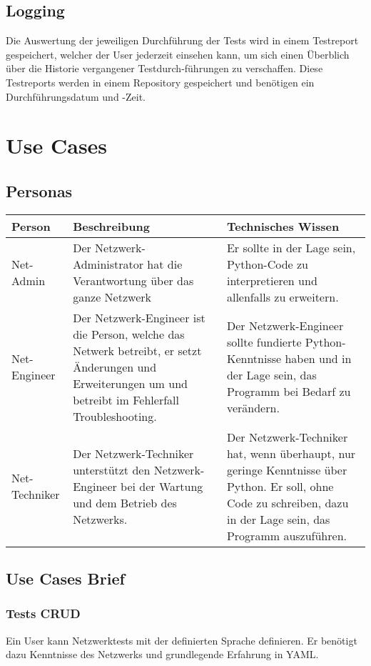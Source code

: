 \documentclass[
	ngerman,
	toc=listof, %
	toc=bibliography, %
	footnotes=multiple, %
	parskip=half, %
	numbers=noendperiod %
]{scrartcl}
\begin{document}
	\subsection{Logging}
		Die Auswertung der jeweiligen Durchführung der Tests wird in einem Testreport gespeichert, welcher der User jederzeit einsehen kann, 
		um sich einen Überblich über die Historie vergangener Testdurch-führungen zu verschaffen. 
		Diese Testreports werden in einem Repository gespeichert und benötigen ein Durchführungsdatum und -Zeit.








\section{Use Cases}
	\subsection{Personas}
		\begin{tabularx}{\textwidth}{lXX}
			\toprule
			Person & Beschreibung & Technisches Wissen \\
			\midrule
			Net-Admin & Der Netzwerk-Administrator hat die Verantwortung über das ganze Netzwerk & Er sollte in der Lage sein, Python-Code zu interpretieren und allenfalls zu erweitern.\\
			\midrule
			Net-Engineer & Der Netzwerk-Engineer ist die Person, welche das Netwerk betreibt, er setzt Änderungen und Erweiterungen um und betreibt im Fehlerfall Troubleshooting. & Der Netzwerk-Engineer sollte fundierte Python-Kenntnisse haben und in der Lage sein, das Programm bei Bedarf zu verändern. \\
			\midrule
			Net-Techniker & Der Netzwerk-Techniker unterstützt den Netzwerk-Engineer bei der Wartung und dem Betrieb des Netzwerks. & Der Netzwerk-Techniker hat, wenn überhaupt, nur geringe Kenntnisse über Python. Er soll, ohne Code zu schreiben, dazu in der Lage sein, das Programm auszuführen. \\
			\bottomrule
		\end{tabularx}

	\subsection{Use Cases Brief}
		\subsubsection{Tests CRUD}
			Ein User kann Netzwerktests mit der definierten Sprache definieren. Er benötigt dazu Kenntnisse des Netzwerks und grundlegende Erfahrung in YAML.
\end{document}
